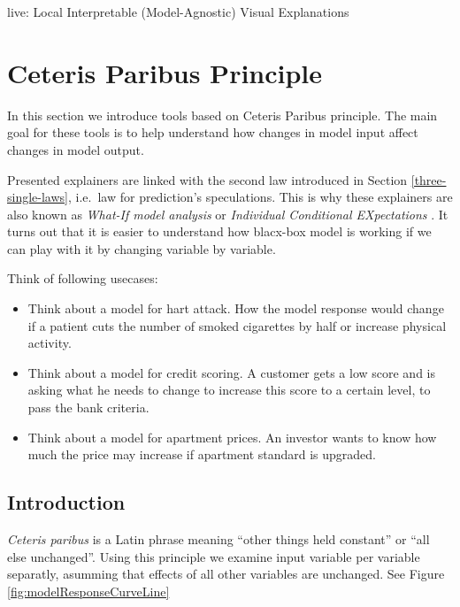 \documentclass[]{book}
\providecommand{\tightlist}{%
  \setlength{\itemsep}{0pt}\setlength{\parskip}{0pt}}
\theoremstyle{definition}
\theoremstyle{definition}
\theoremstyle{definition}
\theoremstyle{remark}
\begin{document}
live: Local Interpretable (Model-Agnostic) Visual Explanations

\hypertarget{ceterisParibus}{%
\chapter{Ceteris Paribus Principle}\label{ceterisParibus}}

In this section we introduce tools based on Ceteris Paribus principle.
The main goal for these tools is to help understand how changes in model
input affect changes in model output.

Presented explainers are linked with the second law introduced in
Section \ref{three-single-laws}, i.e.~law for prediction's speculations.
This is why these explainers are also known as \emph{What-If model
analysis} or \emph{Individual Conditional EXpectations} \citep{ICEbox}.
It turns out that it is easier to understand how blacx-box model is
working if we can play with it by changing variable by variable.

Think of following usecases:

\begin{itemize}
\tightlist
\item
  Think about a model for hart attack. How the model response would
  change if a patient cuts the number of smoked cigarettes by half or
  increase physical activity.
\item
  Think about a model for credit scoring. A customer gets a low score
  and is asking what he needs to change to increase this score to a
  certain level, to pass the bank criteria.
\item
  Think about a model for apartment prices. An investor wants to know
  how much the price may increase if apartment standard is upgraded.
\end{itemize}

\hypertarget{introduction-2}{%
\section{Introduction}\label{introduction-2}}

\emph{Ceteris paribus} is a Latin phrase meaning ``other things held
constant'' or ``all else unchanged''. Using this principle we examine
input variable per variable separatly, asumming that effects of all
other variables are unchanged. See Figure
\ref{fig:modelResponseCurveLine}
\end{document}
